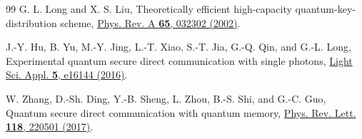\documentclass[aps,pra,twocolumn,amsmath,amssymb,nofootinbib,showpacs,superscriptaddress]{revtex4-1}
\begin{document}
\begin{thebibliography}{99}
G. L. Long and X. S. Liu,
Theoretically efficient high-capacity quantum-key-distribution scheme,
{\href{https://doi.org/10.1103/PhysRevA.65.032302}{Phys. Rev. A {\bf 65}, 032302 (2002)}}.

J.-Y. Hu, B. Yu, M.-Y. Jing, L.-T. Xiao, S.-T. Jia, G.-Q. Qin, and G.-L. Long,
Experimental quantum secure direct communication with single photons,
\href{https://doi.org/10.1038/lsa.2016.144}{Light Sci. Appl. {\bf 5}, e16144 (2016)}.

W. Zhang, D.-Sh. Ding, Y.-B. Sheng, L. Zhou, B.-S. Shi, and G.-C. Guo,
Quantum secure direct communication with quantum memory,
\href{https://doi.org/10.1103/PhysRevLett.118.220501}{Phys. Rev. Lett. {\bf 118}, 220501 (2017)}.

\end{thebibliography}
\end{document}
